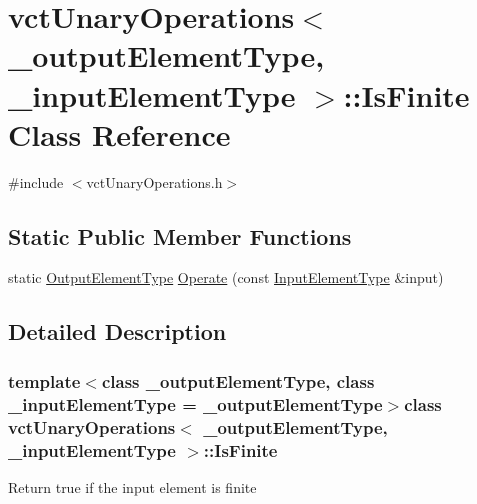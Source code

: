 \hypertarget{classvct_unary_operations_1_1_is_finite}{\section{vct\-Unary\-Operations$<$ \-\_\-output\-Element\-Type, \-\_\-input\-Element\-Type $>$\-:\-:Is\-Finite Class Reference}
\label{classvct_unary_operations_1_1_is_finite}
}


{\ttfamily \#include $<$vct\-Unary\-Operations.\-h$>$}

\subsection*{Static Public Member Functions}
\begin{DoxyCompactItemize}
\item 
static \hyperlink{classvct_unary_operations_a42306ac3dd20d32c6d6c66ac3fa2e7b9}{Output\-Element\-Type} \hyperlink{classvct_unary_operations_1_1_is_finite_a378bc193a8beb9341d5ec0336650d304}{Operate} (const \hyperlink{classvct_unary_operations_abf3b77bb7b8abd7ba72a6a45a65696a7}{Input\-Element\-Type} \&input)
\end{DoxyCompactItemize}


\subsection{Detailed Description}
\subsubsection*{template$<$class \-\_\-output\-Element\-Type, class \-\_\-input\-Element\-Type = \-\_\-output\-Element\-Type$>$class vct\-Unary\-Operations$<$ \-\_\-output\-Element\-Type, \-\_\-input\-Element\-Type $>$\-::\-Is\-Finite}

Return true if the input element is finite 


